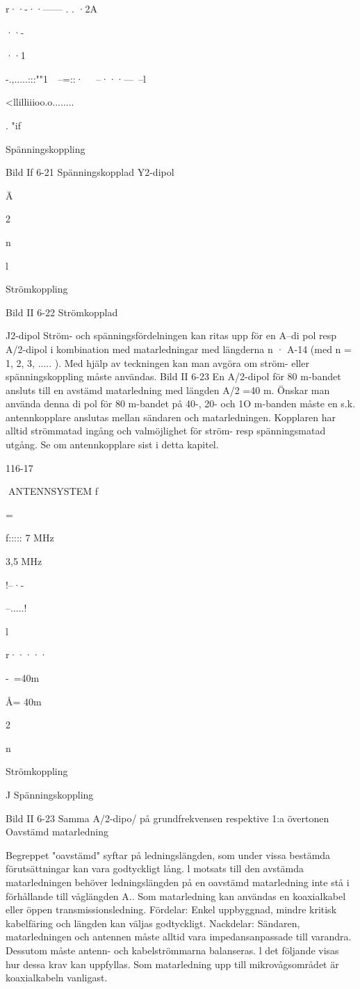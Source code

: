 \documentclass[a4paper,twoside,twocolumn,openright]{book}
\begin{document}
{{{{r··-··------ . . ·2A

··-

··1

-.,.....:::""1~~--=::·~ ~--···---~--l

<llilliiioo.o........

. "if

Spänningskoppling

Bild If 6-21 Spänningskopplad Y2-dipol

Ä

2

n

l

Strömkoppling

Bild II 6-22 Strömkopplad }J2-dipol
Ström- och spänningsfördelningen kan
ritas upp för en A--di pol resp A/2-dipol i kombination med matarledningar med längderna
n · A-14 (med n = 1, 2, 3, ..... ). Med hjälp av
teckningen kan man avgöra om ström- eller
spänningskoppling måste användas.
Bild II 6-23
En A/2-dipol för 80 m-bandet ansluts till
en avstämd matarledning med längden A/2
=40 m.
Önskar man använda denna di pol för 80
m-bandet på 40-, 20- och 1O m-banden
måste en s.k. antennkopplare anslutas mellan sändaren och matarledningen. Kopplaren har alltid strömmatad ingång och valmöjlighet för ström- resp spänningsmatad
utgång. Se om antennkopplare sist i detta
kapitel.

116-17

ANTENNSYSTEM
f

=

f::::: 7 MHz

3,5 MHz

!--·-

--.....!

l

r·····

-~=40m

Å= 40m

2

n

Strömkoppling

J
Spänningskoppling

Bild II 6-23 Samma A/2-dipo/ på grundfrekvensen respektive 1:a övertonen
Oavstämd matarledning

Begreppet "oavstämd" syftar på ledningslängden, som under vissa bestämda förutsättningar kan vara godtyckligt lång. l motsats till den avstämda matarledningen behöver ledningslängden på en oavstämd matarledning inte stå i förhållande till våglängden A.. Som matarledning kan användas en
koaxialkabel eller öppen transmissionsledning.
Fördelar: Enkel uppbyggnad, mindre kritisk kabelfäring och längden kan väljas godtyckligt.
Nackdelar: Sändaren, matarledningen
och antennen måste alltid vara impedansanpassade till varandra. Dessutom måste
antenn- och kabelströmmarna balanseras. l
det följande visas hur dessa krav kan uppfyllas.
Som matarledning upp till mikrovågsområdet är koaxialkabeln vanligast.

}}}
\end{document}
